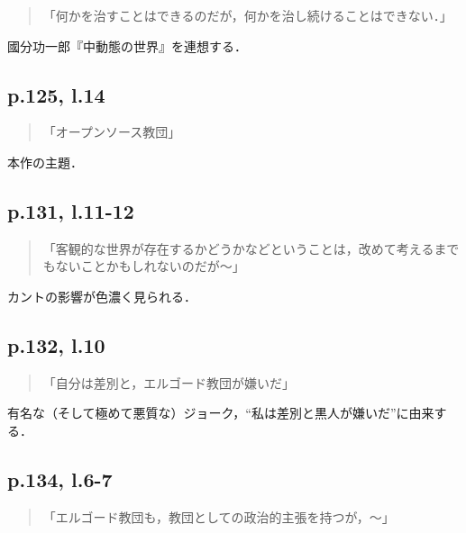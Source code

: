 \documentclass[10pt, a5paper, twoside]{jsarticle}
\theoremstyle{definition}
\begin{document}
			\begin{quote}
				
				「何かを治すことはできるのだが，何かを治し続けることはできない．」

			\end{quote}

			國分功一郎『中動態の世界』を連想する．

		\subsection{p.125, l.14}

			\begin{quote}
				
				「オープンソース教団」

			\end{quote}

			本作の主題．



		\subsection{p.131, l.11-12}

			\begin{quote}
				
				「客観的な世界が存在するかどうかなどということは，改めて考えるまでもないことかもしれないのだが〜」

			\end{quote}

			カントの影響が色濃く見られる．

		\subsection{p.132, l.10}

			\begin{quote}
				
				「自分は差別と，エルゴード教団が嫌いだ」

			\end{quote}

			有名な（そして極めて悪質な）ジョーク，“私は差別と黒人が嫌いだ”に由来する．

		\subsection{p.134, l.6-7}

			\begin{quote}
				
				「エルゴード教団も，教団としての政治的主張を持つが，〜」

			\end{quote}
\end{document}
